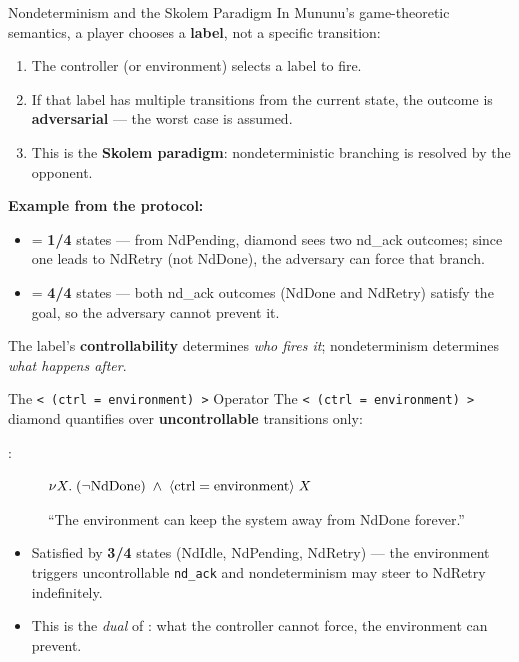 \begin{frame}{Nondeterminism and the Skolem Paradigm}
  In Mununu's game-theoretic semantics, a player chooses a \textbf{label}, not a specific transition:

  \bigskip
  \begin{enumerate}
    \item The controller (or environment) selects a label to fire.
    \item If that label has \alert{multiple transitions} from the current state, the outcome is \textbf{adversarial} --- the worst case is assumed.
    \item This is the \textbf{Skolem paradigm}: nondeterministic branching is resolved by the opponent.
  \end{enumerate}

  \bigskip
  \textbf{Example from the protocol:}
  \begin{itemize}
    \item {} = \textbf{1/4} states --- from NdPending, diamond sees two nd\_ack outcomes; since one leads to NdRetry (not NdDone), the adversary can force that branch.
    \item {} = \textbf{4/4} states --- both nd\_ack outcomes (NdDone and NdRetry) satisfy the goal, so the adversary cannot prevent it.
  \end{itemize}

  \bigskip
  The label's \textbf{controllability} determines \emph{who fires it}; nondeterminism determines \emph{what happens after}.
\end{frame}

\begin{frame}[fragile]{The \texttt{< (ctrl = environment) >} Operator}
  The \texttt{< (ctrl = environment) >} diamond quantifies over \textbf{uncontrollable} transitions only:

  \bigskip
  

  \medskip
  \begin{description}
    \item[:] $\nu X.\; (\lnot\text{NdDone}) \;\land\; \langle\text{ctrl}=\text{environment}\rangle\; X$

    ``The environment can keep the system away from NdDone forever.''
  \end{description}

  \bigskip
  \begin{itemize}
    \item Satisfied by \textbf{3/4} states (NdIdle, NdPending, NdRetry) --- the environment triggers uncontrollable \texttt{nd\_ack} and nondeterminism may steer to NdRetry indefinitely.
    \item This is the \emph{dual} of : what the controller cannot force, the environment can prevent.
  \end{itemize}
\end{frame}

